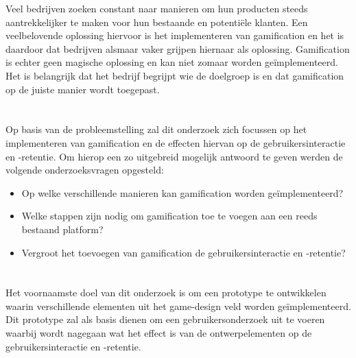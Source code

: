 Veel bedrijven zoeken constant naar manieren om hun producten steeds aantrekkelijker te maken voor hun bestaande en potentiële klanten. Een veelbelovende oplossing hiervoor is het implementeren van gamification en het is daardoor dat bedrijven alsmaar vaker grijpen hiernaar als oplossing. Gamification is echter geen magische oplossing en kan niet zomaar worden geïmplementeerd. Het is belangrijk dat het bedrijf begrijpt wie de doelgroep is en dat gamification op de juiste manier wordt toegepast.

\section{}
\label{sec:onderzoeksvraag}

Op basis van de probleemstelling zal dit onderzoek zich focussen op het implementeren van gamification en de effecten hiervan op de gebruikersinteractie en -retentie. Om hierop een zo uitgebreid mogelijk antwoord te geven werden de volgende onderzoeksvragen opgesteld:

\begin{itemize}
 \item Op welke verschillende manieren kan gamification worden geïmplementeerd?
 \item Welke stappen zijn nodig om gamification toe te voegen aan een reeds bestaand platform?
 \item Vergroot het toevoegen van gamification de gebruikersinteractie en -retentie?
\end{itemize}

\section{}
\label{sec:onderzoeksdoelstelling}

Het voornaamste doel van dit onderzoek is om een prototype te ontwikkelen waarin verschillende elementen uit het game-design veld worden geïmplementeerd. Dit prototype zal als basis dienen om een gebruikersonderzoek uit te voeren waarbij wordt nagegaan wat het effect is van de ontwerpelementen op de gebruikersinteractie en -retentie.

\section{}
\label{sec:opzet-bachelorproef}


